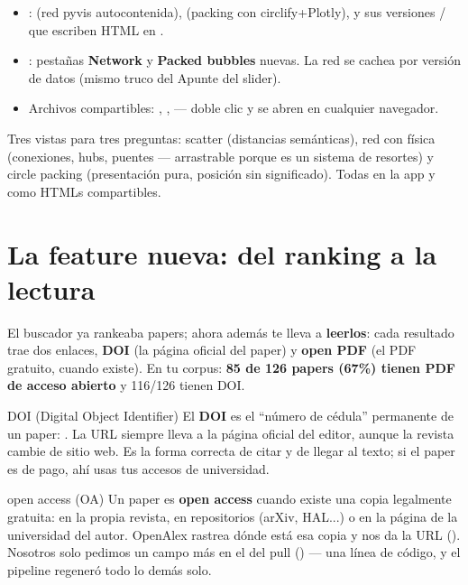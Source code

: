 \documentclass[11pt,a4paper]{article}
\begin{document}
\begin{itemize}
  \item {}:  (red pyvis autocontenida),
         (packing con circlify+Plotly), y sus versiones
        / que escriben HTML en .
  \item {}: pestañas \textbf{Network} y \textbf{Packed bubbles} nuevas. La red
        se cachea por versión de datos (mismo truco del Apunte del slider).
  \item Archivos compartibles: , ,
         — doble clic y se abren en cualquier navegador.
\end{itemize}

\begin{resumen}
Tres vistas para tres preguntas: scatter (distancias semánticas), red con física (conexiones,
hubs, puentes — arrastrable porque es un sistema de resortes) y circle packing (presentación
pura, posición sin significado). Todas en la app y como HTMLs compartibles.
\end{resumen}
\clearpage
{}
{}

\section{La feature nueva: del ranking a la lectura}

El buscador ya rankeaba papers; ahora además te lleva a \textbf{leerlos}: cada resultado
trae dos enlaces, \textbf{DOI} (la página oficial del paper) y \textbf{open PDF} (el PDF
gratuito, cuando existe). En tu corpus: \textbf{85 de 126 papers (67\%) tienen PDF de acceso
abierto} y 116/126 tienen DOI.

\begin{concepto}{DOI (Digital Object Identifier)}
El \textbf{DOI} es el ``número de cédula'' permanente de un paper: .
La URL  siempre lleva a la página oficial del editor, aunque
la revista cambie de sitio web. Es la forma correcta de citar y de llegar al texto; si el
paper es de pago, ahí usas tus accesos de universidad.
\end{concepto}

\begin{concepto}{open access (OA)}
Un paper es \textbf{open access} cuando existe una copia legalmente gratuita: en la propia
revista, en repositorios (arXiv, HAL...) o en la página de la universidad del autor. OpenAlex
rastrea dónde está esa copia y nos da la URL (). Nosotros solo pedimos un
campo más en el  del pull () — una línea de código,
y el pipeline regeneró todo lo demás solo.
\end{concepto}
\end{document}
